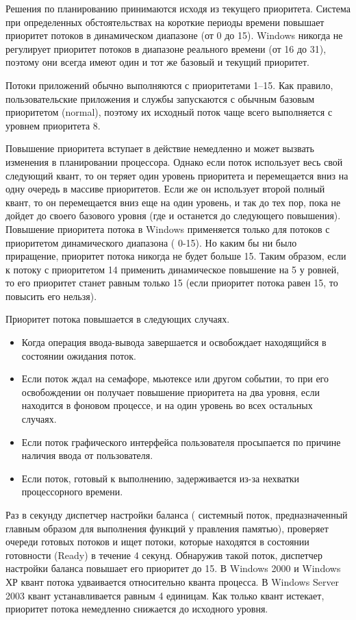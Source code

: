 Решения по планированию принимаются исходя из текущего приоритета. Система при определенных обстоятельствах на короткие периоды времени повышает приоритет потоков в динамическом диапазоне (от 0 до 15). Windows никогда не регулирует приоритет потоков в диапазоне реального времени (от 16 до 31), поэтому они всегда имеют один и тот же базовый и текущий приоритет.

Потоки приложений обычно выполняются с приоритетами 1–15. Как правило, пользовательские приложения и службы запускаются с обычным базовым приоритетом (normal), поэтому их исходный поток чаще всего выполняется с уровнем приоритета 8.

Повышение приоритета вступает в действие немедленно и может вызвать изменения в планировании процессора. Однако если поток использует весь свой следующий квант, то он теряет один уровень приоритета и перемещается вниз на одну очередь в массиве приоритетов. Если же он использует второй полный квант, то он перемещается вниз еще на один уровень, и так до тех пор, пока не дойдет до своего базового уровня (где и останется до следующего повышения). Повышение приоритета потока в Windows применяется только для потоков с
приоритетом динамического диапазона ( 0-15). Но каким бы ни было приращение, приоритет потока никогда не будет больше 15. Таким образом, если к потоку с приоритетом 14 применить динамическое повышение на 5 у ровней, то его приоритет станет равным только 15 (если приоритет потока равен 15, то повысить его нельзя).

Приоритет потока повышается в следующих случаях.
\begin{itemize}
	\item Когда операция ввода-вывода завершается и освобождает находящийся в
	состоянии ожидания поток.
	\item Если поток ждал на семафоре, мьютексе или другом событии, то при его
	освобождении он получает повышение приоритета на два уровня, если находится в фоновом процессе, и на один уровень во всех остальных случаях. 
	\item Если поток графического интерфейса пользователя просыпается по причине наличия ввода от пользователя.
	\item Если поток, готовый к выполнению, задерживается из-за нехватки процессорного времени.
\end{itemize}

Раз в секунду диспетчер настройки баланса ( системный поток, предназначенный главным образом для выполнения функций у правления памятью), проверяет очереди готовых потоков и ищет потоки, которые находятся в состоянии готовности (Ready) в течение 4 секунд. Обнаружив такой поток, диспетчер настройки баланса повышает его приоритет до 15. В Windows 2000 и Windows ХР квант потока удваивается относительно кванта процесса. В Windows Server 2003 квант устанавливается равным 4 единицам. Как только квант истекает, приоритет потока немедленно снижается до исходного уровня.

